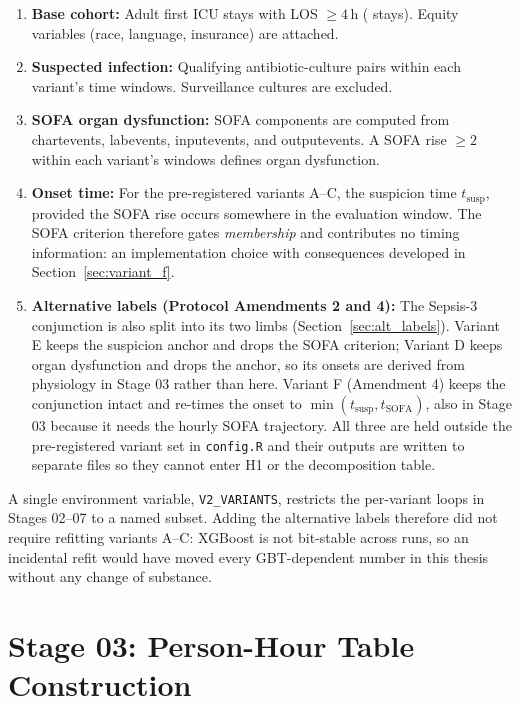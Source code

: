 \begin{enumerate}
    \item \textbf{Base cohort:} Adult first ICU stays with LOS $\geq 4$\,h
    (\pcNStays{} stays). Equity variables (race, language, insurance) are attached.

    \item \textbf{Suspected infection:} Qualifying antibiotic-culture pairs
    within each variant's time windows. Surveillance cultures are excluded.

    \item \textbf{SOFA organ dysfunction:} SOFA components are computed from
    chartevents, labevents, inputevents, and outputevents. A SOFA rise
    $\geq 2$ within each variant's windows defines organ dysfunction.

    \item \textbf{Onset time:} For the pre-registered variants A--C, the
    suspicion time $t_{\text{susp}}$, provided the SOFA rise occurs somewhere in
    the evaluation window. The SOFA criterion therefore gates \emph{membership}
    and contributes no timing information: an implementation choice with
    consequences developed in Section~\ref{sec:variant_f}.

    \item \textbf{Alternative labels (Protocol Amendments 2 and 4):} The Sepsis-3
    conjunction is also split into its two limbs
    (Section~\ref{sec:alt_labels}). Variant E keeps the suspicion anchor and
    drops the SOFA criterion; Variant D keeps organ dysfunction and drops the
    anchor, so its onsets are derived from physiology in Stage 03 rather than
    here. Variant F (Amendment 4) keeps the conjunction intact and re-times the
    onset to $\min(t_{\text{susp}}, t_{\text{SOFA}})$, also in Stage 03 because
    it needs the hourly SOFA trajectory. All three are held outside the
    pre-registered variant set in \texttt{config.R} and their outputs are
    written to separate files so they cannot enter H1 or the decomposition
    table.
\end{enumerate}

A single environment variable, \texttt{V2\_VARIANTS}, restricts the per-variant
loops in Stages 02--07 to a named subset. Adding the alternative labels
therefore did not require refitting variants A--C: XGBoost is not bit-stable
across runs, so an incidental refit would have moved every GBT-dependent number
in this thesis without any change of substance.


\section{Stage 03: Person-Hour Table Construction}

